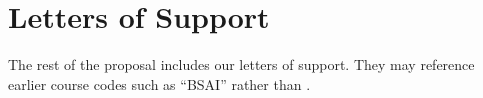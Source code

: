 
\section{Letters of Support}

The rest of the proposal includes our letters of support.  They may
reference earlier course codes such as ``BSAI'' rather than \prefix{}.









